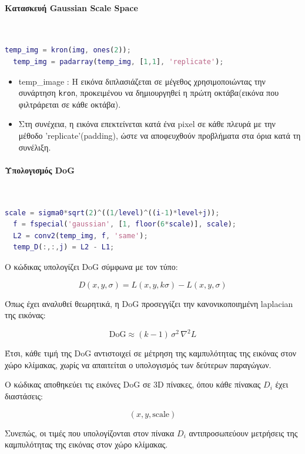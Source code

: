 \documentclass[12pt]{article}
\begin{document}
\paragraph{Κατασκευή Gaussian Scale Space}
\mbox{}\\
\begin{lstlisting}[language=Matlab]
  temp_img = kron(img, ones(2)); 
  temp_img = padarray(temp_img, [1,1], 'replicate'); 
\end{lstlisting}
\begin{itemize}
  \item temp\_image : Η εικόνα διπλασιάζεται σε μέγεθος χρησιμοποιώντας την συνάρτηση \texttt{kron}, προκειμένου να δημιουργηθεί η πρώτη οκτάβα(εικόνα που φιλτράρεται σε κάθε οκτάβα).
  \item Στη συνέχεια, η εικόνα επεκτείνεται κατά ένα pixel σε κάθε πλευρά με την μέθοδο 'replicate'(padding), ώστε να αποφευχθούν προβλήματα στα όρια κατά τη συνέλιξη.
\end{itemize}


\paragraph{Υπολογισμός DoG}
\mbox{}\\
\begin{lstlisting}[language=Matlab]
  scale = sigma0*sqrt(2)^((1/level)^((i-1)*level+j)); 
  f = fspecial('gaussian', [1, floor(6*scale)], scale);
  L2 = conv2(temp_img, f, 'same');
  temp_D(:,:,j) = L2 - L1;
\end{lstlisting}
  
  Ο κώδικας υπολογίζει DoG σύμφωνα με τον τύπο:
  
  \[
  D(x,y,\sigma) = L(x,y,k\sigma) - L(x,y,\sigma)
  \]
  
  Όπως έχει αναλυθεί θεωρητικά, η DoG προσεγγίζει την κανονικοποιημένη laplacian της εικόνας:
  
  \[
  \mathrm{DoG} \approx (k-1) \, \sigma^2 \, \nabla^2 L
  \]
  
  Έτσι, κάθε τιμή της DoG αντιστοιχεί σε μέτρηση της καμπυλότητας της εικόνας στον χώρο κλίμακας, χωρίς να απαιτείται ο υπολογισμός των δεύτερων παραγώγων.
  
  Ο κώδικας αποθηκεύει τις εικόνες DoG σε 3D πίνακες, όπου κάθε πίνακας $D_i$ έχει διαστάσεις:
  
  \[
  (x, y, \text{scale})
  \]
  
Συνεπώς, οι τιμές που υπολογίζονται στον πίνακα $D_i$ αντιπροσωπεύουν μετρήσεις της καμπυλότητας της εικόνας στον χώρο κλίμακας.
\end{document}
